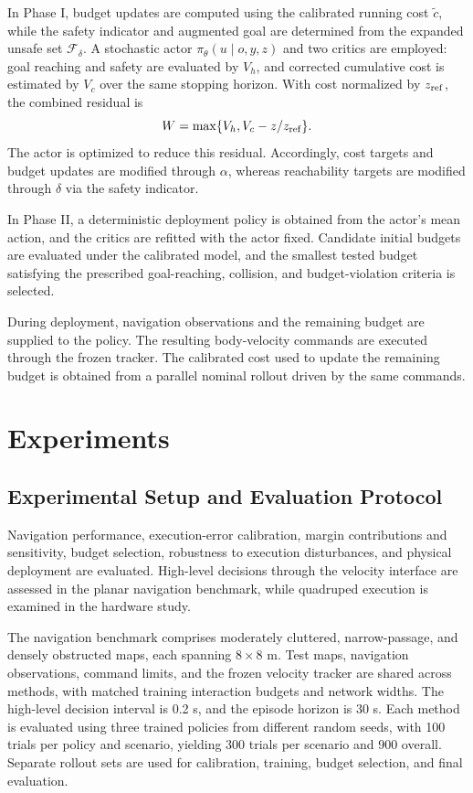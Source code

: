 \documentclass[conference]{IEEEtran}
\begin{document}
In Phase I, budget updates are computed using the calibrated running cost $\tilde c$,
while the safety indicator and augmented goal are determined from the expanded
unsafe set $\mathcal{F}_\delta$. A stochastic actor
$\pi_\theta(u\mid o,y,z)$ and two critics are employed: goal reaching and safety
are evaluated by $V_h$, and corrected cumulative cost is estimated by $V_c$ over
the same stopping horizon. With
cost normalized by $z_{\rm ref}$, the combined residual is
\[
W=\max\{V_h,V_c-z/z_{\rm ref}\}.
\]
The actor is optimized to reduce this residual. Accordingly, cost targets and
budget updates are modified through $\alpha$, whereas reachability targets are
modified through $\delta$ via the safety indicator.

In Phase II, a deterministic deployment policy is obtained from the actor's mean
action, and the critics are refitted with the actor fixed. Candidate initial
budgets are evaluated under the calibrated model, and the smallest tested budget
satisfying the prescribed goal-reaching, collision, and budget-violation criteria
is selected.

During deployment, navigation observations and the remaining budget are supplied
to the policy. The resulting body-velocity commands are executed through the
frozen tracker. The calibrated cost used to update the remaining budget is
obtained from a parallel nominal rollout driven by the same commands.

\section{Experiments}
\subsection{Experimental Setup and Evaluation Protocol}
\label{sec:experimental_setup}
Navigation performance, execution-error calibration, margin contributions and
sensitivity, budget selection, robustness to execution disturbances, and physical
deployment are evaluated. High-level decisions through the velocity interface are
assessed in the planar navigation benchmark, while quadruped execution is examined
in the hardware study.

The navigation benchmark comprises moderately cluttered, narrow-passage, and
densely obstructed maps, each spanning $8\times8$ m. Test maps, navigation
observations, command limits, and the frozen velocity tracker are shared across
methods, with matched training interaction budgets and network widths. The high-level decision
interval is 0.2 s, and the episode horizon is 30 s. Each method is evaluated using
three trained policies from different random seeds, with 100 trials per policy
and scenario, yielding 300 trials per scenario and 900 overall. Separate rollout
sets are used for calibration, training, budget selection, and final evaluation.
\end{document}
